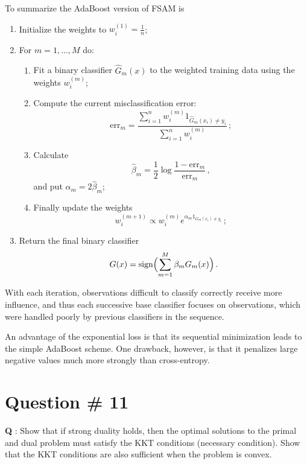 \documentclass[a4paper]{article}
\begin{document}
To summarize the AdaBoost version of FSAM is
\begin{enumerate}
	\item Initialize the weights to $w_i^{(1)} = \frac{1}{n}$;
	\item For $m=1,\ldots, M$ do: \begin{enumerate}
		\item Fit a binary classifier $\hat{G}_m(x)$ to the weighted training data using
		the weights $w_i^{(m)}$;
		\item Compute the current misclassification error:
		\[
		\text{err}_m
			=\frac{ \sum_{i=1}^n w_i^{(m)} 1_{\hat{G}_m(x_i) \neq y_i}}{\sum_{i=1}^n w_i^{(m)}} \,;
		\]
		\item Calculate 
		\[ \hat{\beta}_m = \frac{1}{2} \log \frac{1-\text{err}_m}{\text{err}_m}\,, \]
		and put $\alpha_m = 2 \hat{\beta}_m$;
		\item Finally update the weights
		\[ w_i^{(m+1)} \propto w_i^{(m)} e^{ \alpha_m 1_{G_m(x_i)\neq y_i }} \,; \]
	\end{enumerate}
	\item Return the final binary classifier 
		\[ G(x) = \text{sign}\Bigl( \sum_{m=1}^M \beta_m G_m(x) \Bigr) \,. \]
\end{enumerate}

With each iteration, observations difficult to classify correctly receive more
influence, and thus each successive base classifier focuses on observations, which
were handled poorly by previous classifiers in the sequence.

An advantage of the exponential loss is that its sequential minimization leads to
the simple AdaBoost scheme. One drawback, however, is that it penalizes large negative
values much more strongly than cross-entropy.

\clearpage

\section[Convex optimization]{Question \# 11} %
\label{sec:question_11}
\textbf{\large \textbf{Q}} : Show that if strong duality holds, then the optimal
solutions to the primal and dual problem must satisfy the KKT conditions (necessary
condition). Show that the KKT conditions are also sufficient when the problem is
convex.
\end{document}

